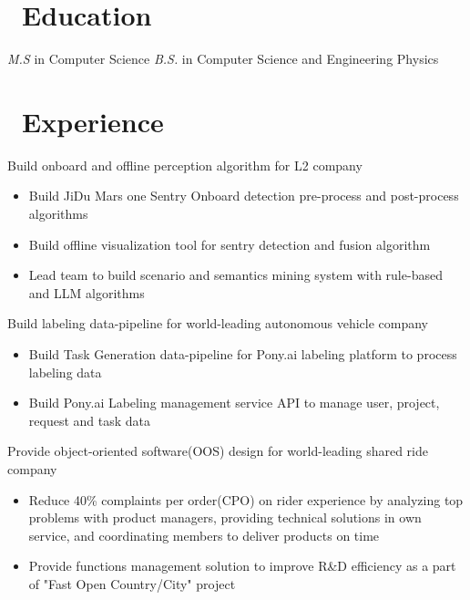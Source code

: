 \documentclass{resume}
\begin{document}



\section{\faGraduationCap\ Education}
\textit{M.S} in Computer Science
\textit{B.S.} in Computer Science and Engineering Physics

\section{\faUsers\ Experience}
Build onboard and offline perception algorithm for L2 company
\begin{itemize}
  \item Build JiDu Mars one Sentry Onboard detection pre-process and post-process algorithms
  \item Build offline visualization tool for sentry detection and fusion algorithm
  \item Lead team to build scenario and semantics mining system with rule-based and LLM algorithms
\end{itemize}

Build labeling data-pipeline for world-leading autonomous vehicle company
\begin{itemize}
  \item Build Task Generation data-pipeline for Pony.ai labeling platform to process labeling data
  \item Build Pony.ai Labeling management service API to manage user, project, request and task data
\end{itemize}

Provide object-oriented software(OOS) design for world-leading shared ride company
\begin{itemize}
  \item Reduce 40\% complaints per order(CPO) on rider experience by analyzing top problems with product managers, providing technical solutions in own service, and coordinating members to deliver products on time
  \item Provide functions management solution to improve R\&D efficiency as a part of "Fast Open Country/City" project
\end{itemize}
\end{document}
